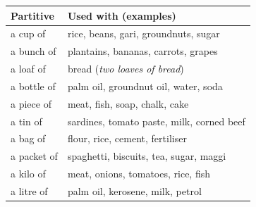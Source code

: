 \documentclass[11pt]{article}
\begin{document}
\begin{aretenir}
\begin{center}
\begin{tabularx}{\linewidth}{|l|X|}
\hline
\rowcolor{popgreenL}
\textbf{Partitive} & \textbf{Used with (examples)} \\
\hline
a cup of & rice, beans, gari, groundnuts, sugar \\
\hline
a bunch of & plantains, bananas, carrots, grapes \\
\hline
a loaf of & bread (\emph{two loaves of bread}) \\
\hline
a bottle of & palm oil, groundnut oil, water, soda \\
\hline
a piece of & meat, fish, soap, chalk, cake \\
\hline
a tin of & sardines, tomato paste, milk, corned beef \\
\hline
a bag of & flour, rice, cement, fertiliser \\
\hline
a packet of & spaghetti, biscuits, tea, sugar, maggi \\
\hline
a kilo of & meat, onions, tomatoes, rice, fish \\
\hline
a litre of & palm oil, kerosene, milk, petrol \\
\hline
\end{tabularx}
\end{center}
\end{aretenir}
\end{document}
